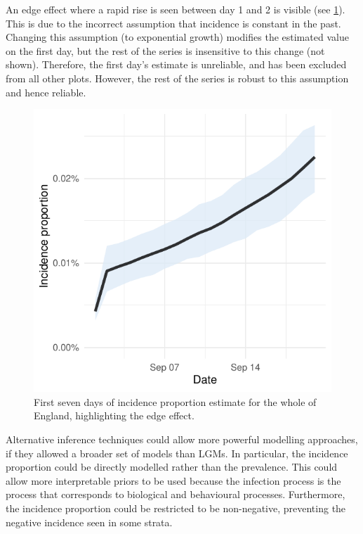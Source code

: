 \documentclass[thesis.tex]{subfiles}
\begin{document}
An edge effect where a rapid rise is seen between day 1 and 2 is visible (see \cref{transmission:fig:backcalc-start-effect}).
This is due to the incorrect assumption that incidence is constant in the past.
Changing this assumption (\eg to exponential growth) modifies the estimated value on the first day, but the rest of the series is insensitive to this change (not shown).
Therefore, the first day's estimate is unreliable, and has been excluded from all other plots.
However, the rest of the series is robust to this assumption and hence reliable.
\begin{figure}
    \centering \includegraphics{transmission/backcalc-start-effect}
    \caption[Edge effects in backcalculation method]{%
        First seven days of incidence proportion estimate for the whole of England, highlighting the edge effect.
    }
    \label{transmission:fig:backcalc-start-effect}
\end{figure}

Alternative inference techniques could allow more powerful modelling approaches, if they allowed a broader set of models than LGMs.
In particular, the incidence proportion could be directly modelled rather than the prevalence.
This could allow more interpretable priors to be used because the infection process is the process that corresponds to biological and behavioural processes.
Furthermore, the incidence proportion could be restricted to be non-negative, preventing the negative incidence seen in some strata.
\end{document}
